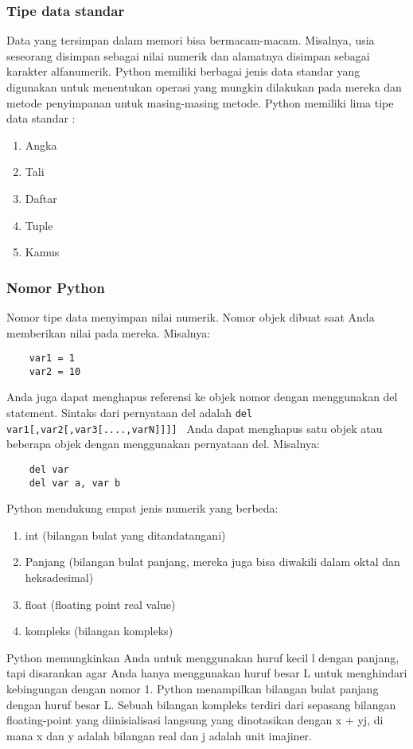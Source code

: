 \subsubsection{Tipe data standar}
	Data yang tersimpan dalam memori bisa bermacam-macam. Misalnya, usia seseorang disimpan sebagai nilai numerik dan alamatnya disimpan sebagai karakter alfanumerik. Python memiliki berbagai jenis data standar yang digunakan untuk menentukan operasi yang mungkin dilakukan pada mereka dan metode penyimpanan untuk masing-masing metode.
Python memiliki lima tipe data standar :
\begin{enumerate}
	\item Angka
	\item Tali
	\item Daftar
	\item Tuple
	\item Kamus
\end{enumerate}

\subsubsection{Nomor Python}
Nomor tipe data menyimpan nilai numerik. Nomor objek dibuat saat Anda memberikan nilai pada mereka. 
Misalnya: 
\begin{verbatim}
	var1 = 1 
	var2 = 10
\end{verbatim}
Anda juga dapat menghapus referensi ke objek nomor dengan menggunakan del statement. Sintaks dari pernyataan del adalah 
\verb|del var1[,var2[,var3[....,varN]]]] |
Anda dapat menghapus satu objek atau beberapa objek dengan menggunakan pernyataan del. 
Misalnya:
\begin{verbatim}
	del var 
	del var a, var b 
\end{verbatim}
Python mendukung empat jenis numerik yang berbeda:
\begin{enumerate}
	\item int (bilangan bulat yang ditandatangani) 
	\item Panjang (bilangan bulat panjang, mereka juga bisa diwakili dalam oktal dan heksadesimal) 
	\item float (floating point real value)
	\item kompleks (bilangan kompleks) 
\end{enumerate}
Python memungkinkan Anda untuk menggunakan huruf kecil l dengan panjang, tapi disarankan agar Anda hanya menggunakan huruf besar L untuk menghindari kebingungan dengan nomor 1.  
Python menampilkan bilangan bulat panjang dengan huruf besar L.
Sebuah bilangan kompleks terdiri dari sepasang bilangan floating-point yang diinisialisasi langsung yang dinotasikan dengan x + yj, di mana x dan y adalah bilangan real dan j adalah unit imajiner. 

